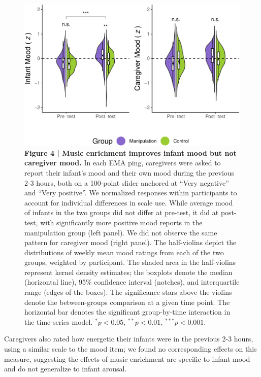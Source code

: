 \documentclass[
]{article}
\begin{document}
\begin{figure}[p]
\includegraphics{MIPH_childdev_files/figure-latex/fig4-1} \caption{\textbf{Figure 4 | Music enrichment improves infant mood but not caregiver mood.} In each EMA ping, caregivers were asked to report their infant's mood and their own mood during the previous 2-3 hours, both on a 100-point slider anchored at ``Very negative'' and ``Very positive''. We normalized responses within participants to account for individual differences in scale use. While average mood of infants in the two groups did not differ at pre-test, it did at post-test, with significantly more positive mood reports in the manipulation group (left panel). We did not observe the same pattern for caregiver mood (right panel). The half-violins depict the distributions of weekly mean mood ratings from each of the two groups, weighted by participant. The shaded area in the half-violins represent kernel density estimates; the boxplots denote the median (horizontal line), 95\% confidence interval (notches), and interquartile range (edges of the boxes). The significance stars above the violins denote the between-groups comparison at a given time point. The horizontal bar denotes the significant group-by-time interaction in the time-series model. $^{\ast}p < 0.05$, $^{\ast\ast}p < 0.01$, $^{\ast\ast\ast}p < 0.001$.}\label{fig:fig4}
\end{figure}

Caregivers also rated how energetic their infants were in the previous
2-3 hours, using a similar scale to the mood item; we found no
corresponding effects on this measure, suggesting the effects of music
enrichment are specific to infant mood and do not generalize to infant
arousal.
\end{document}
